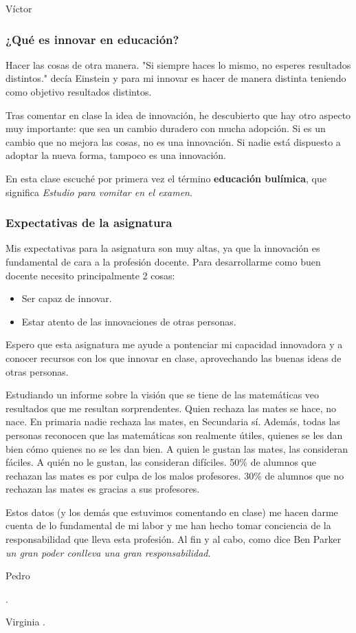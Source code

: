\begin{opin}{\victorcolor}{Víctor}

\subsubsection{¿Qué es innovar en educación?}

Hacer las cosas de otra manera. "Si siempre haces lo mismo, no esperes resultados distintos." decía Einstein y para mi innovar es hacer de manera distinta teniendo como objetivo resultados distintos.


Tras comentar en clase la idea de innovación, he descubierto que hay otro aspecto muy importante: que sea un cambio duradero con mucha adopción.
%
Si es un cambio que no mejora las cosas, no es una innovación. 
%
Si nadie está dispuesto a adoptar la nueva forma, tampoco es una innovación.

En esta clase escuché por primera vez el término \textbf{educación bulímica}, que significa \textit{Estudio para vomitar en el examen}.


\subsubsection{Expectativas de la asignatura}


Mis expectativas para la asignatura son muy altas, ya que la innovación es fundamental de cara a la profesión docente.
%
Para desarrollarme como buen docente necesito principalmente 2 cosas:
\begin{itemize}
	\item Ser capaz de innovar.
 	\item Estar atento de las innovaciones de otras personas.
 \end{itemize} 

Espero que esta asignatura me ayude a pontenciar mi capacidad innovadora y a conocer recursos con los que innovar en clase, aprovechando las buenas ideas de otras personas.


Estudiando un informe sobre la visión que se tiene de las matemáticas veo resultados que me resultan sorprendentes. 
%
Quien rechaza las mates se hace, no nace. En primaria nadie rechaza las mates, en Secundaria sí.
%
Además, todas las personas reconocen que las matemáticas son realmente útiles, quienes se les dan bien cómo quienes no se les dan bien.
%
A quien le gustan las mates, las consideran fáciles. A quién no le gustan, las consideran difíciles. 50\% de alumnos que rechazan las mates es por culpa de los malos profesores. 30\% de alumnos que no rechazan las mates es gracias a sus profesores. 

Estos datos (y los demás que estuvimos comentando en clase) me hacen darme cuenta de lo fundamental de mi labor y me han hecho tomar conciencia de la responsabilidad que lleva esta profesión. Al fin y al cabo, como dice Ben Parker \textit{un gran poder conlleva una gran responsabilidad}.


\end{opin}

\begin{opin}{\pedrocolor}{Pedro}

.


\end{opin}

\begin{opin}{\virgicolor}{Virginia}
.


\end{opin}
